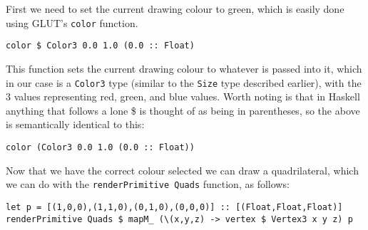 \documentclass[12pt, a4paper]{report}
\begin{document}
First we need to set the current drawing colour to green, which is easily done using GLUT's \verb|color| function.

\begin{lstlisting}
color $ Color3 0.0 1.0 (0.0 :: Float)
\end{lstlisting}

This function sets the current drawing colour to whatever is passed into it, which in our case is a \verb|Color3| type (similar to the \verb|Size| type described earlier), with the 3 values representing red, green, and blue values.
Worth noting is that in Haskell anything that follows a lone \$ is thought of as being in parentheses, so the above is semantically identical to this:

\begin{lstlisting}
color (Color3 0.0 1.0 (0.0 :: Float))
\end{lstlisting}

Now that we have the correct colour selected we can draw a quadrilateral, which we can do with the \verb|renderPrimitive Quads| function, as follows:

\begin{lstlisting}[xleftmargin=-0.1\textwidth, xrightmargin=-0.1\textwidth]
let p = [(1,0,0),(1,1,0),(0,1,0),(0,0,0)] :: [(Float,Float,Float)]
renderPrimitive Quads $ mapM_ (\(x,y,z) -> vertex $ Vertex3 x y z) p
\end{lstlisting}
\end{document}
